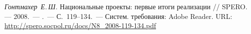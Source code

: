\begin{thebibliography}{99}
   \emph{Гонтмахер~Е.\,Ш.} Национальные проекты: первые
  итоги реализации // SPERO. — 2008.~--- .~--- С.~119--134.~---
  Систем. требования: Adobe Reader. URL:
  \url{http://spero.socpol.ru/docs/N8_2008-119-134.pdf}
\end{thebibliography}
